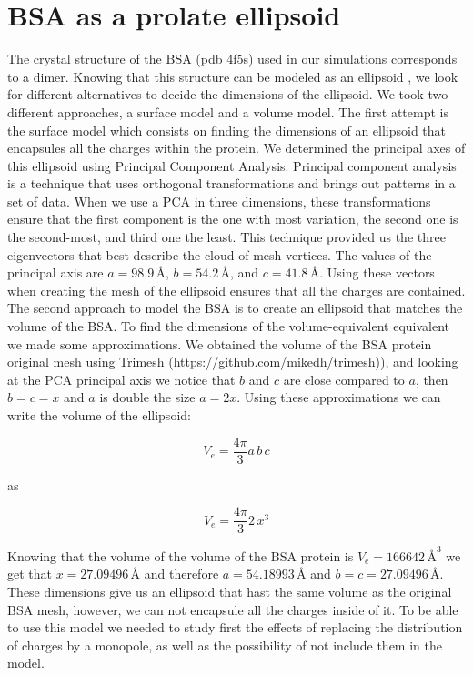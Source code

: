
\section{BSA as a prolate ellipsoid}
\graphicspath{{rom_studies/figs/}}

The crystal structure of the BSA (pdb 4f5s) used in our simulations corresponds
to a dimer. Knowing that this structure can be modeled as an ellipsoid \cite{SquireETal1968},
we look for different alternatives to decide the dimensions of the ellipsoid. We took two
different approaches, a surface model and a volume model. The first attempt is 
the surface model which consists on finding the dimensions
of an ellipsoid that encapsules all the charges within the protein. We determined the principal axes of this
ellipsoid using Principal Component Analysis. Principal component analysis is a technique that
uses orthogonal transformations and brings out patterns in a set of data. When 
we use a PCA in three dimensions, these transformations ensure that the first 
component is the one with most variation, the second one is the second-most, and
third one the least. This technique provided us the three eigenvectors that best 
describe the cloud of mesh-vertices. The values of the principal axis are $a=98.9\, \text{\AA}$, $b=54.2\, \text{\AA}$, and $c=41.8\, \text{\AA}$. 
Using these vectors when creating the mesh of the ellipsoid ensures that all the charges are contained.
The second approach to model the BSA is to create an ellipsoid that matches the volume of the BSA. To find the dimensions 
of the volume-equivalent equivalent we made some approximations. We obtained the volume of the BSA protein original mesh
using Trimesh (\url{https://github.com/mikedh/trimesh})), and looking at the PCA principal axis we notice that $b$ and $c$ are close 
compared to $a$, then $b=c=x$ and $a$ is double the size $a=2x$. Using these approximations we can write the volume of the ellipsoid:

\begin{equation}
    V_e = \frac{4\pi}{3}a\,b\,c 
\end{equation}

as 

\begin{equation}
    V_e = \frac{4\pi}{3}2\,x^3
\end{equation}

Knowing that the volume of the volume of the BSA protein is $V_e = 166642 \, \text{\AA}^3$ we get that $x=27.09496 \, \text{\AA}$ 
and therefore $a=54.18993 \, \text{\AA}$ and $b=c=27.09496 \, \text{\AA}$. These dimensions give us an ellipsoid that hast the same volume 
as the original BSA mesh, however, we can not encapsule all the charges inside of it. To be able to use this model we needed to study first the 
effects of replacing the distribution of charges by a monopole, as well as the possibility of not include them in the model. 

